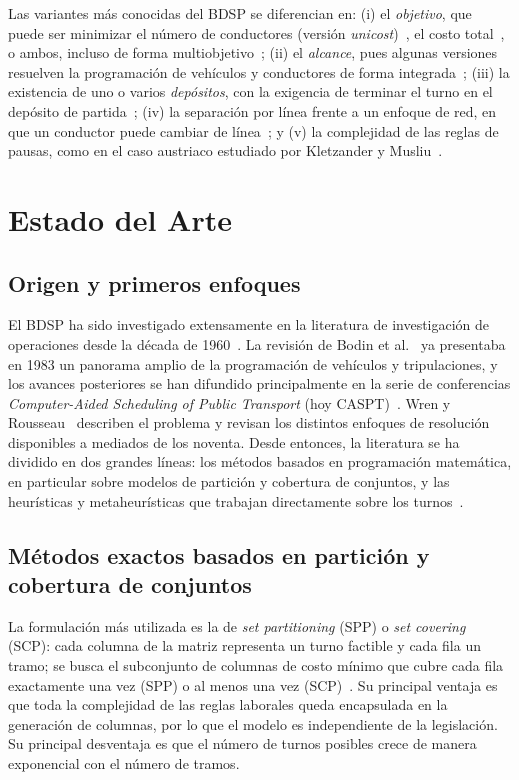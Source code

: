 \documentclass[letter, 10pt]{article}
\begin{document}
Las variantes más conocidas del BDSP se diferencian en: (i) el \emph{objetivo}, que puede ser minimizar el número de conductores (versión \emph{unicost})~\cite{Yunes2005}, el costo total~\cite{Constantino2017}, o ambos, incluso de forma multiobjetivo~\cite{Lourenco2001}; (ii) el \emph{alcance}, pues algunas versiones resuelven la programación de vehículos y conductores de forma integrada~\cite{Huisman2005}; (iii) la existencia de uno o varios \emph{depósitos}, con la exigencia de terminar el turno en el depósito de partida~\cite{DeLeone2011a}; (iv) la separación por línea frente a un enfoque de red, en que un conductor puede cambiar de línea~\cite{Portugal2009,Constantino2017}; y (v) la complejidad de las reglas de pausas, como en el caso austriaco estudiado por Kletzander y Musliu~\cite{Kletzander2020}.

\section{Estado del Arte}\label{sec:eda}

\subsection{Origen y primeros enfoques}
El BDSP ha sido investigado extensamente en la literatura de investigación de operaciones desde la década de 1960~\cite{Constantino2017}. La revisión de Bodin et al.~\cite{Bodin1983} ya presentaba en 1983 un panorama amplio de la programación de vehículos y tripulaciones, y los avances posteriores se han difundido principalmente en la serie de conferencias \emph{Computer-Aided Scheduling of Public Transport} (hoy CASPT)~\cite{Constantino2017}. Wren y Rousseau~\cite{WrenRousseau1995} describen el problema y revisan los distintos enfoques de resolución disponibles a mediados de los noventa. Desde entonces, la literatura se ha dividido en dos grandes líneas: los métodos basados en programación matemática, en particular sobre modelos de partición y cobertura de conjuntos, y las heurísticas y metaheurísticas que trabajan directamente sobre los turnos~\cite{Constantino2017}.

\subsection{Métodos exactos basados en partición y cobertura de conjuntos}
La formulación más utilizada es la de \emph{set partitioning} (SPP) o \emph{set covering} (SCP): cada columna de la matriz representa un turno factible y cada fila un tramo; se busca el subconjunto de columnas de costo mínimo que cubre cada fila exactamente una vez (SPP) o al menos una vez (SCP)~\cite{Portugal2009,DeLeone2011a}. Su principal ventaja es que toda la complejidad de las reglas laborales queda encapsulada en la generación de columnas, por lo que el modelo es independiente de la legislación. Su principal desventaja es que el número de turnos posibles crece de manera exponencial con el número de tramos.
\end{document}
